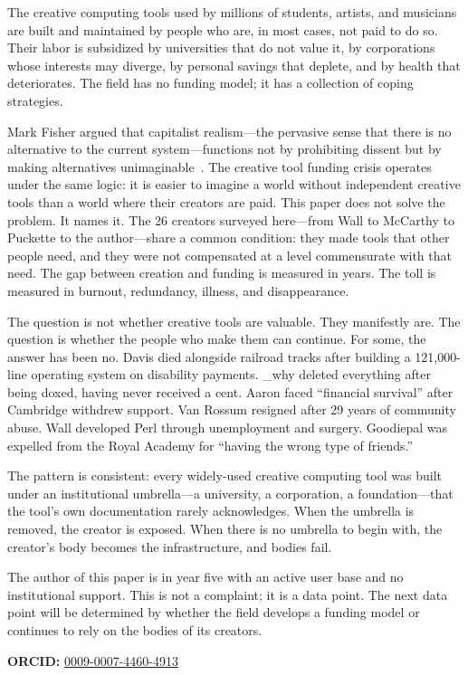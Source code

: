 \documentclass[10pt,letterpaper,twocolumn]{article}
\begin{document}
The creative computing tools used by millions of students, artists, and musicians are built and maintained by people who are, in most cases, not paid to do so. Their labor is subsidized by universities that do not value it, by corporations whose interests may diverge, by personal savings that deplete, and by health that deteriorates. The field has no funding model; it has a collection of coping strategies.

Mark Fisher argued that capitalist realism---the pervasive sense that there is no alternative to the current system---functions not by prohibiting dissent but by making alternatives unimaginable~\citep{fisher2009capitalist}. The creative tool funding crisis operates under the same logic: it is easier to imagine a world without independent creative tools than a world where their creators are paid. This paper does not solve the problem. It names it. The 26 creators surveyed here---from Wall to McCarthy to Puckette to the author---share a common condition: they made tools that other people need, and they were not compensated at a level commensurate with that need. The gap between creation and funding is measured in years. The toll is measured in burnout, redundancy, illness, and disappearance.

The question is not whether creative tools are valuable. They manifestly are. The question is whether the people who make them can continue. For some, the answer has been no. Davis died alongside railroad tracks after building a 121,000-line operating system on disability payments. \_why deleted everything after being doxed, having never received a cent. Aaron faced ``financial survival'' after Cambridge withdrew support. Van Rossum resigned after 29 years of community abuse. Wall developed Perl through unemployment and surgery. Goodiepal was expelled from the Royal Academy for ``having the wrong type of friends.''

The pattern is consistent: every widely-used creative computing tool was built under an institutional umbrella---a university, a corporation, a foundation---that the tool's own documentation rarely acknowledges. When the umbrella is removed, the creator is exposed. When there is no umbrella to begin with, the creator's body becomes the infrastructure, and bodies fail.

The author of this paper is in year five with an active user base and no institutional support. This is not a complaint; it is a data point. The next data point will be determined by whether the field develops a funding model or continues to rely on the bodies of its creators.

\vspace{0.5em}
\noindent\textbf{ORCID:} \href{https://orcid.org/0009-0007-4460-4913}{0009-0007-4460-4913}



\end{document}
